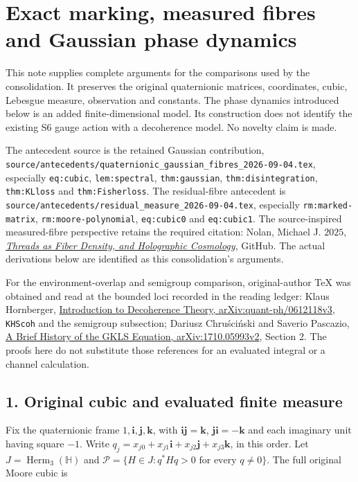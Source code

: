 \documentclass[
  11pt,
]{article}
\author{}
\date{}
\begin{document}
\section{Exact marking, measured fibres and Gaussian phase
dynamics}\label{exact-marking-measured-fibres-and-gaussian-phase-dynamics}

This note supplies complete arguments for the comparisons used by the
consolidation. It preserves the original quaternionic matrices,
coordinates, cubic, Lebesgue measure, observation and constants. The
phase dynamics introduced below is an added finite-dimensional model.
Its construction does not identify the existing S6 gauge action with a
decoherence model. No novelty claim is made.

The antecedent source is the retained Gaussian contribution,
\texttt{source/antecedents/quaternionic\_gaussian\_fibres\_2026-09-04.tex},
especially \texttt{eq:cubic}, \texttt{lem:spectral},
\texttt{thm:gaussian}, \texttt{thm:disintegration}, \texttt{thm:KLloss}
and \texttt{thm:Fisherloss}. The residual-fibre antecedent is
\texttt{source/antecedents/residual\_measure\_2026-09-04.tex},
especially \texttt{rm:marked-matrix}, \texttt{rm:moore-polynomial},
\texttt{eq:cubic0} and \texttt{eq:cubic1}. The source-inspired
measured-fibre perspective retains the required citation: Nolan, Michael
J. \(2025\),
\href{https://github.com/mikalnolan/Holographic-Spindle-Torus-Cosmology}{\emph{Threads
as Fiber Density, and Holographic Cosmology}}, GitHub. The actual
derivations below are identified as this consolidation's arguments.

For the environment-overlap and semigroup comparison, original-author
TeX was obtained and read at the bounded loci recorded in the reading
ledger: Klaus Hornberger,
\href{https://arxiv.org/abs/quant-ph/0612118v3}{Introduction to
Decoherence Theory, arXiv:quant-ph/0612118v3}, \texttt{KHScoh} and the
semigroup subsection; Dariusz Chruściński and Saverio Pascazio,
\href{https://arxiv.org/abs/1710.05993v2}{A Brief History of the GKLS
Equation, arXiv:1710.05993v2}, Section 2. The proofs here do not
substitute those references for an evaluated integral or a channel
calculation.

\subsection{1. Original cubic and evaluated finite
measure}\label{original-cubic-and-evaluated-finite-measure}

Fix the quaternionic frame \(1,\mathbf i,\mathbf j,\mathbf k\), with
\(\mathbf i\mathbf j=\mathbf k\), \(\mathbf j\mathbf i=-\mathbf k\) and
each imaginary unit having square \(-1\). Write
\(q_j=x_{j0}+x_{j1}\mathbf i+x_{j2}\mathbf j+x_{j3}\mathbf k\), in this
order. Let \(J=\operatorname{Herm}_3(\mathbb H)\) and
\(\mathcal P=\{H\in J:q^*Hq>0\text{ for every }q\ne0\}\). The full
original Moore cubic is
\end{document}
